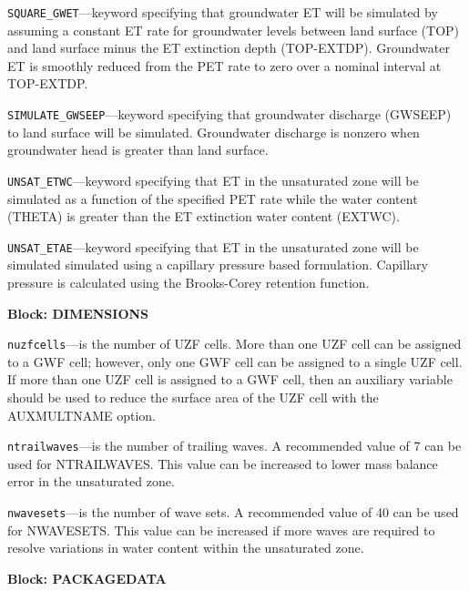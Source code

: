 \begin{description}
\item \texttt{SQUARE\_GWET}---keyword specifying that groundwater ET will be simulated by assuming a constant ET rate for groundwater levels between land surface (TOP) and land surface minus the ET extinction depth (TOP-EXTDP). Groundwater ET is smoothly reduced from the PET rate to zero over a nominal interval at TOP-EXTDP.

\item \texttt{SIMULATE\_GWSEEP}---keyword specifying that groundwater discharge (GWSEEP) to land surface will be simulated. Groundwater discharge is nonzero when groundwater head is greater than land surface.

\item \texttt{UNSAT\_ETWC}---keyword specifying that ET in the unsaturated zone will be simulated as a function of the specified PET rate while the water content (THETA) is greater than the ET extinction water content (EXTWC).

\item \texttt{UNSAT\_ETAE}---keyword specifying that ET in the unsaturated zone will be simulated simulated using a capillary pressure based formulation. Capillary pressure is calculated using the Brooks-Corey retention function.

\end{description}
\item \textbf{Block: DIMENSIONS}

\begin{description}
\item \texttt{nuzfcells}---is the number of UZF cells.  More than one UZF cell can be assigned to a GWF cell; however, only one GWF cell can be assigned to a single UZF cell. If more than one UZF cell is assigned to a GWF cell, then an auxiliary variable should be used to reduce the surface area of the UZF cell with the AUXMULTNAME option.

\item \texttt{ntrailwaves}---is the number of trailing waves.  A recommended value of 7 can be used for NTRAILWAVES.  This value can be increased to lower mass balance error in the unsaturated zone.

\item \texttt{nwavesets}---is the number of wave sets.  A recommended value of 40 can be used for NWAVESETS.  This value can be increased if more waves are required to resolve variations in water content within the unsaturated zone.

\end{description}
\item \textbf{Block: PACKAGEDATA}


